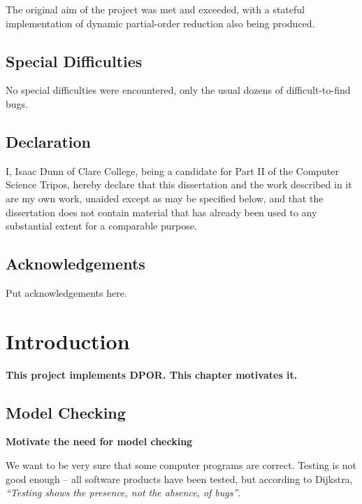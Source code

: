 \documentclass[12pt,a4paper,twoside,openright]{report}
\begin{document}
The original aim of the project was met and exceeded, with
a stateful implementation of dynamic partial-order reduction
also being produced.

\section*{Special Difficulties}

No special difficulties were encountered, only the usual dozens of
difficult-to-find bugs.
 
\newpage
\section*{Declaration}

I, Isaac Dunn of Clare College, being a candidate for Part II of the Computer
Science Tripos, hereby declare
that this dissertation and the work described in it are my own work,
unaided except as may be specified below, and that the dissertation
does not contain material that has already been used to any substantial
extent for a comparable purpose.

\bigskip
{}

\bigskip
{}

\tableofcontents

\listoffigures

\newpage
\section*{Acknowledgements}

Put acknowledgements here.


\pagestyle{headings}

\chapter{Introduction}
\textbf{This project implements DPOR. This
	chapter motivates it.}

\section{Model Checking}
\textbf{Motivate the need for model checking}

We want to be very sure that some computer
programs are correct. Testing is not good
enough -- all software products have been
tested, but according to Dijkstra,
\emph{``Testing shows the presence,
	not the absence, of bugs''}.
\end{document}
